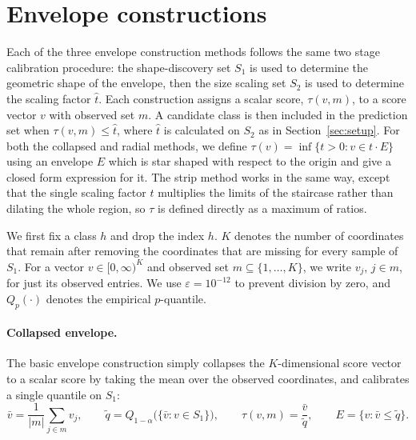 \section{Envelope constructions}
\label{sec3:constructions}

Each of the three envelope construction methods follows the same two stage calibration procedure: the shape-discovery set $S_1$ is 
used to determine the geometric shape of the envelope, then the size scaling set $S_2$ is used to determine the scaling factor 
$\hat t$. Each construction assigns a scalar score, $\tau(v,m)$, to a score vector $v$ with observed set $m$. A candidate class is 
then included in the prediction set when $\tau(v,m)\le\hat t$, where $\hat t$ is calculated on $S_2$ as in Section~\ref{sec:setup}. 
For both the collapsed and radial methods, we define $\tau(v)=\inf\{t>0: v\in t\cdot E\}$ using an envelope $E$ which is star shaped 
with respect to the origin and give a closed form expression for it. The strip method works in the same way, except that the 
single scaling factor $\hat t$ multiplies the limits of the staircase rather than dilating the whole region, so $\tau$ is defined 
directly as a maximum of ratios.

We first fix a class $h$ and drop the index $h$. $K$ denotes the number of coordinates that remain after removing the coordinates 
that are missing for every sample of $S_1$. For a vector $v\in[0,\infty)^K$ and observed set $m\subseteq\{1,\dots,K\}$, we write 
$v_j$, $j\in m$, for just its observed entries. We use $\varepsilon=10^{-12}$ to prevent division by zero, and $Q_p(\cdot)$ denotes 
the empirical $p$-quantile.


\paragraph{Collapsed envelope.} The basic envelope construction simply collapses the $K$-dimensional score vector to a scalar score 
by taking the mean over the observed coordinates, and calibrates a single quantile on $S_1$:
\begin{equation}\label{eq:collapsed}
\bar v=\frac{1}{|m|}\sum_{j\in m}v_j,\qquad \tilde q=Q_{1-\alpha}\bigl(\{\bar v:v\in S_1\}\bigr),\qquad
\tau(v,m)=\frac{\bar v}{\tilde q},\qquad
E=\{v:\bar v\le\tilde q\}.
\end{equation}

